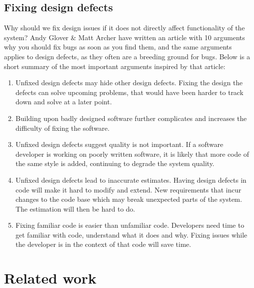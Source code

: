 \documentclass{report}
\begin{document}
\section{Fixing design defects}
\label{fix-design-issues}
Why should we fix design issues if it does not directly affect functionality of the system? Andy Glover \& Matt Archer have written an article with 10 arguments why you should fix bugs as soon as you find them\cite{10reasons}, and the same arguments applies to design defects, as they often are a breeding ground for bugs. Below is a short summary of the most important arguments inspired by that article:
\begin{enumerate}
    \item Unfixed design defects may hide other design defects. Fixing the design the defects can solve upcoming problems, that would have been harder to track down and solve at a later point.
    \item Building upon badly designed software further complicates and increases the difficulty of fixing the software.
    \item Unfixed design defects suggest quality is not important. If a software developer is working on poorly written software, it is likely that more code of the same style is added, continuing to degrade the system quality.
    \item Unfixed design defects lead to inaccurate estimates. Having design defects in code will make it hard to modify and extend. New requirements that incur changes to the code base which may break unexpected parts of the system. The estimation will then be hard to do.
    \item Fixing familiar code is easier than unfamiliar code. Developers need time to get familiar with code, understand what it does and why. Fixing issues while the developer is in the context of that code will save time.
\end{enumerate}


\chapter{Related work}
\label{relatedwork}
\end{document}
